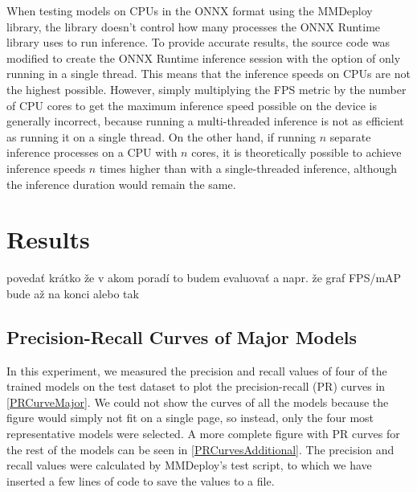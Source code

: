 When testing models on CPUs in the ONNX format using the MMDeploy library, the
library doesn't control how many processes the ONNX Runtime library uses to run
inference. To provide accurate results, the source code was modified to create
the ONNX Runtime inference session with the option of only running in a single
thread. This means that the inference speeds on CPUs are not the highest
possible. However, simply multiplying the FPS metric by the number of CPU cores
to get the maximum inference speed possible on the device is generally
incorrect, because running a multi-threaded inference is not as efficient as
running it on a single thread. On the other hand, if running $n$ separate
inference processes on a CPU with $n$ cores, it is theoretically possible to
achieve inference speeds $n$ times higher than with a single-threaded inference,
although the inference duration would remain the same.











\chapter{Results}
\label{Results}
povedať krátko že v akom poradí to budem evaluovať a napr. že graf FPS/mAP bude až na konci alebo tak








\section{Precision-Recall Curves of Major Models}


In this experiment, we measured the precision and recall values of four of the
trained models on the test dataset to plot the precision-recall (PR) curves in
\autoref{PRCurveMajor}. We could not show the curves of all the models because
the figure would simply not fit on a single page, so instead, only the four most
representative models were selected. A more complete figure with PR curves for
the rest of the models can be seen in \autoref{PRCurvesAdditional}. The
precision and recall values were calculated by MMDeploy's test script, to which
we have inserted a few lines of code to save the values to a file.

